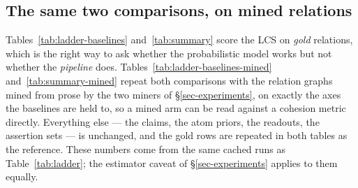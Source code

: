 \subsection{The same two comparisons, on mined relations}
\label{sec-mined-baselines}

Tables~\ref{tab:ladder-baselines} and~\ref{tab:summary} score the LCS on \emph{gold} relations, which
is the right way to ask whether the probabilistic model works but not whether the \emph{pipeline} does.
Tables~\ref{tab:ladder-baselines-mined} and~\ref{tab:summary-mined} repeat both comparisons with the
relation graphs mined from prose by the two miners of \S\ref{sec-experiments}, on exactly the axes the
baselines are held to, so a mined arm can be read against a cohesion metric directly. Everything else
--- the claims, the atom priors, the readouts, the assertion sets --- is unchanged, and the gold rows
are repeated in both tables as the reference. These numbers come from the same cached runs as
Table~\ref{tab:ladder}; the estimator caveat of \S\ref{sec-experiments} applies to them equally.

